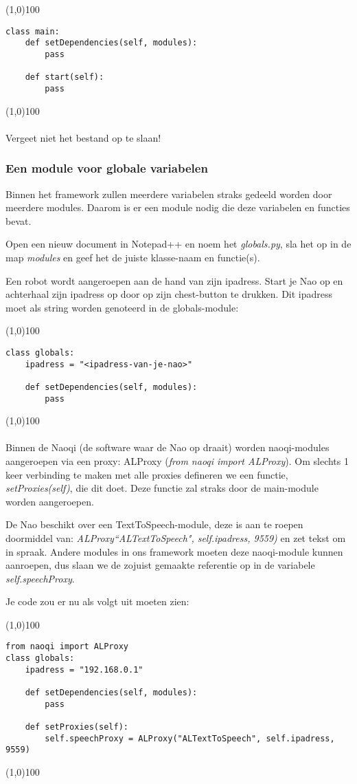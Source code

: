 \documentclass[dutch, a4paper]{article}
\begin{document}
\noindent \line(1,0){100}
\begin{verbatim}
class main:
    def setDependencies(self, modules):
        pass

    def start(self):
        pass
\end{verbatim}
\noindent \line(1,0){100}
\\\\
Vergeet niet het bestand op te slaan!

\subsubsection{Een module voor globale variabelen}
Binnen het framework zullen meerdere variabelen straks gedeeld worden door meerdere modules. Daarom is er een module nodig die deze variabelen en functies bevat.

Open een nieuw document in Notepad++ en noem het \textit{globals.py}, sla het op in de map \textit{modules} en geef het de juiste klasse-naam en functie(s). 

Een robot wordt aangeroepen aan de hand van zijn ipadress. Start je Nao op en achterhaal zijn ipadress op door op zijn chest-button te drukken. Dit ipadress moet als string worden genoteerd in de globals-module:

\noindent \line(1,0){100}
\begin{verbatim}
class globals:
    ipadress = "<ipadress-van-je-nao>"

    def setDependencies(self, modules):
        pass
\end{verbatim}
\noindent \line(1,0){100}
\\\\
Binnen de Naoqi (de software waar de Nao op draait) worden naoqi-modules aangeroepen via een proxy: ALProxy (\textit{from naoqi import ALProxy}). Om slechts 1 keer verbinding te maken met alle proxies defineren we een functie, \textit{setProxies(self)}, die dit doet. Deze functie zal straks door de main-module worden aangeroepen.

De Nao beschikt over een TextToSpeech-module, deze is aan te roepen doormiddel van: \textit{ALProxy``ALTextToSpeech", self.ipadress, 9559)}
en zet tekst om in spraak. Andere modules in ons framework moeten deze naoqi-module kunnen aanroepen, dus slaan we de zojuist gemaakte referentie op in de variabele \textit{self.speechProxy}.

Je code zou er nu als volgt uit moeten zien:

\noindent \line(1,0){100}
\begin{verbatim}
from naoqi import ALProxy
class globals:
    ipadress = "192.168.0.1"

    def setDependencies(self, modules):
        pass

    def setProxies(self):
        self.speechProxy = ALProxy("ALTextToSpeech", self.ipadress, 9559)
\end{verbatim}
\noindent \line(1,0){100}
\end{document}
